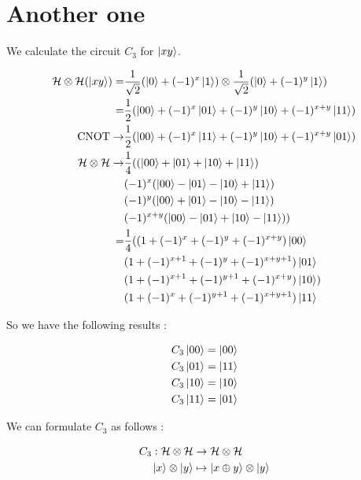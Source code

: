 \documentclass{article}
\theoremstyle{plain}
\begin{document}
  \section{Another one}

    We calculate the circuit $C_3$ for $\ket{xy}$.

    \begin{align*}
      \mathcal{H} \otimes \mathcal{H} (\ket{xy}) =&
          \frac{1}{\sqrt 2} (\ket 0 + (-1)^x \ket 1) \otimes
          \frac{1}{\sqrt 2} (\ket 0 + (-1)^y \ket 1) \\
       =& \frac{1}{2} (\ket{00} + (-1)^x \ket{01} +
                      (-1)^y \ket{10} + (-1)^{x + y} \ket {11}) \\
      \text{CNOT} \to& 
          \frac{1}{2} (\ket{00} + (-1)^x \ket{11} +
                      (-1)^y \ket{10} + (-1)^{x + y} \ket {01}) \\
    \mathcal{H} \otimes \mathcal{H} \to& 
           \frac{1}{4} ((\ket{00} + \ket{01} + \ket{10} + \ket{11})\\
              &(-1)^x    (\ket{00} - \ket{01} - \ket{10} + \ket{11}) \\
              &(-1)^y    (\ket{00} + \ket{01} - \ket{10} - \ket{11}) \\
              &(-1)^{x+y}(\ket{00} - \ket{01} + \ket{10} - \ket{11})) \\
        =& \frac{1}{4} ((1 + (-1)^x + (-1)^y + (-1)^{x+y})\ket{00} \\
                      & (1 + (-1)^{x+1} + (-1)^y + (-1)^{x+y+1})\ket{01} \\
                      & (1 + (-1)^{x+1} + (-1)^{y+1} + (-1)^{x+y})\ket{10}) \\
                      & (1 + (-1)^x     + (-1)^{y+1} + (-1)^{x+y+1})\ket{11}
    \end{align*}

    So we have the following results :

    \begin{align*}
      C_3 \ket{00} &= \ket{00} \\ 
      C_3 \ket{01} &= \ket{11} \\
      C_3 \ket{10} &= \ket{10} \\ 
      C_3 \ket{11} &= \ket{01} 
    \end{align*}

    We can formulate $C_3$ as follows :

    \begin{align*}
     C_3 : \mathcal H \otimes \mathcal H &\to \mathcal H \otimes \mathcal H \\
      \ket{x} \otimes \ket{y} &\mapstochar\to \ket{x \oplus y} \otimes \ket y
    \end{align*}
\end{document}
